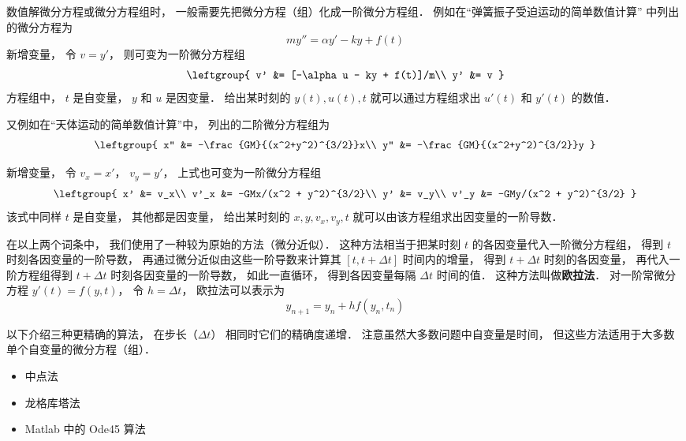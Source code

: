 

数值解微分方程或微分方程组时， 一般需要先把微分方程（组）化成一阶微分方程组． 例如在“弹簧振子受迫运动的简单数值计算” 中列出的微分方程为
\begin{equation}
m y'' = \alpha y' - ky + f(t)
\end{equation}
新增变量， 令 $v = y'$， 则可变为一阶微分方程组
\begin{equation}\leftgroup{
v' &= [-\alpha u - ky + f(t)]/m\\
y' &= v
}\end{equation}
方程组中， $t$ 是自变量， $y$ 和 $u$ 是因变量． 给出某时刻的 $y(t), u(t), t$ 就可以通过方程组求出 $u'(t)$ 和 $y'(t)$ 的数值．

又例如在“天体运动的简单数值计算”中， 列出的二阶微分方程组为
\begin{equation}
\leftgroup{
x'' &= -\frac{GM}{(x^2+y^2)^{3/2}}x\\
y'' &= -\frac{GM}{(x^2+y^2)^{3/2}}y
}\end{equation}

新增变量， 令 $v_x = x'$， $v_y = y'$， 上式也可变为一阶微分方程组
\begin{equation}\leftgroup{
x' &= v_x\\
v'_x &= -GMx/(x^2 + y^2)^{3/2}\\
y' &= v_y\\
v'_y &= -GMy/(x^2 + y^2)^{3/2}
}\end{equation}
该式中同样 $t$ 是自变量， 其他都是因变量， 给出某时刻的 $x, y, v_x, v_y, t$ 就可以由该方程组求出因变量的一阶导数．

在以上两个词条中， 我们使用了一种较为原始的方法（微分近似）． 这种方法相当于把某时刻 $t$ 的各因变量代入一阶微分方程组， 得到 $t$ 时刻各因变量的一阶导数， 再通过微分近似由这些一阶导数来计算其 $[t, t + \Delta t]$ 时间内的增量， 得到 $t +\Delta t$ 时刻的各因变量， 再代入一阶方程组得到 $t +\Delta t$ 时刻各因变量的一阶导数， 如此一直循环， 得到各因变量每隔 $\Delta t$ 时间的值． 这种方法叫做\textbf{欧拉法}． 对一阶常微分方程 $y'(t) = f(y, t)$， 令 $h = \Delta t$， 欧拉法可以表示为
\begin{equation}
y_{n+1} = y_n + h f(y_n, t_n)
\end{equation}

以下介绍三种更精确的算法， 在步长（$\Delta t$） 相同时它们的精确度递增． 注意虽然大多数问题中自变量是时间， 但这些方法适用于大多数单个自变量的微分方程（组）．

\begin{itemize}
\item 中点法
\item 龙格库塔法
\item Matlab 中的 Ode45 算法
\end{itemize}












